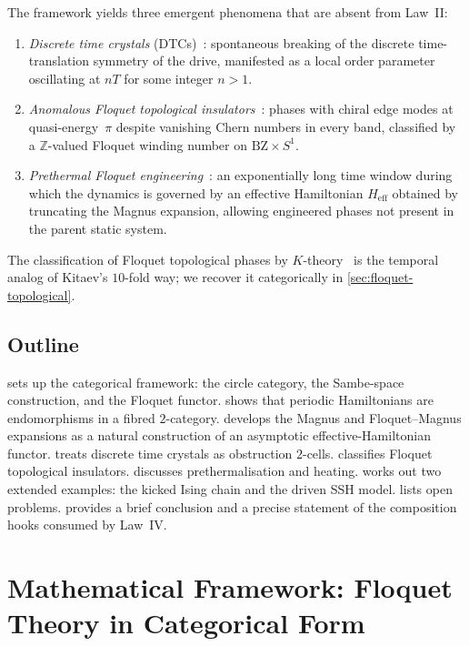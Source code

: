 \documentclass[12pt]{article}
\theoremstyle{definition}
\theoremstyle{remark}
\newcommand{\Heff}{H_{\mathrm{eff}}}
\begin{document}
The framework yields three emergent phenomena that are absent from Law~II:
\begin{enumerate}
\item \emph{Discrete time crystals} (DTCs)~\cite{else2016,khemani2016}: spontaneous breaking of the discrete time-translation symmetry of the drive, manifested as a local order parameter oscillating at $nT$ for some integer $n>1$.
\item \emph{Anomalous Floquet topological insulators}~\cite{rudner2020}: phases with chiral edge modes at quasi-energy~$\pi$ despite vanishing Chern numbers in every band, classified by a $\mathbb{Z}$-valued Floquet winding number on $\mathrm{BZ}\times S^1$.
\item \emph{Prethermal Floquet engineering}~\cite{bukov2015,abanin2015}: an exponentially long time window during which the dynamics is governed by an effective Hamiltonian $\Heff$ obtained by truncating the Magnus expansion, allowing engineered phases not present in the parent static system.
\end{enumerate}

The classification of Floquet topological phases by $K$-theory~\cite{roy2017} is the temporal analog of Kitaev's $10$-fold way; we recover it categorically in \cref{sec:floquet-topological}.

\subsection{Outline}

 sets up the categorical framework: the circle category, the Sambe-space construction, and the Floquet functor.  shows that periodic Hamiltonians are endomorphisms in a fibred $2$-category.  develops the Magnus and Floquet--Magnus expansions as a natural construction of an asymptotic effective-Hamiltonian functor.  treats discrete time crystals as obstruction $2$-cells.  classifies Floquet topological insulators.  discusses prethermalisation and heating.  works out two extended examples: the kicked Ising chain and the driven SSH model.  lists open problems.  provides a brief conclusion and a precise statement of the composition hooks consumed by Law~IV.

\section{Mathematical Framework: Floquet Theory in Categorical Form}
\label{sec:framework}
\end{document}
